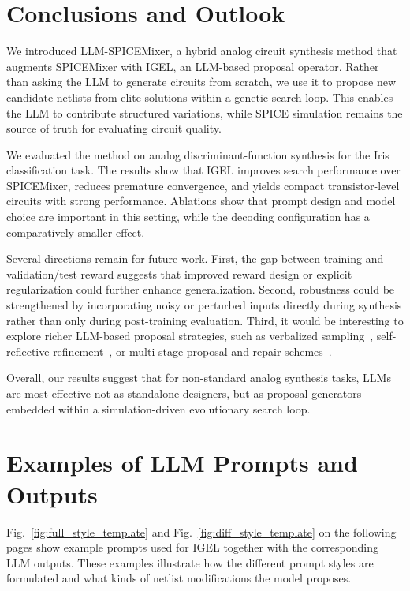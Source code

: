 \documentclass[sigconf,pbalance]{acmart_modified}
\newcommand{\squeezeSection}{}
\newcommand{\llmspm}{LLM-SPICE\-Mixer}
\newcommand{\spm}{SPICE\-Mixer}
\begin{document}
\squeezeSection\section{Conclusions and Outlook}
\label{sec:conclusions_and_outlook}

We introduced \llmspm{}, a hybrid analog circuit synthesis method that augments \spm{} with IGEL, an LLM-based proposal operator. Rather than asking the LLM to generate circuits from scratch, we use it to propose new candidate netlists from elite solutions within a genetic search loop. This enables the LLM to contribute structured variations, while SPICE simulation remains the source of truth for evaluating circuit quality.

We evaluated the method on analog discriminant-function synthesis for the Iris classification task. The results show that IGEL improves search performance over \spm{}, reduces premature convergence, and yields compact transistor-level circuits with strong performance. Ablations show that prompt design and model choice are important in this setting, while the decoding configuration has a comparatively smaller effect.

Several directions remain for future work. First, the gap between training and validation/test reward suggests that improved reward design or explicit regularization could further enhance generalization. Second, robustness could be strengthened by incorporating noisy or perturbed inputs directly during synthesis rather than only during post-training evaluation. Third, it would be interesting to explore richer LLM-based proposal strategies, such as verbalized sampling~\cite{zhang2025verbalized}, self-reflective refinement~\cite{madaan2023self,ye2024reevo}, or multi-stage proposal-and-repair schemes~\cite{zhang2025analogxpert,lai2026analogcoder}.

Overall, our results suggest that for non-standard analog synthesis tasks, LLMs are most effective not as standalone designers, but as proposal generators embedded within a simulation-driven evolutionary search loop.




\clearpage
\appendix
\onecolumn


\squeezeSection\section{Examples of LLM Prompts and Outputs}
\label{appx:prompt_and_output}
Fig.~\ref{fig:full_style_template} and Fig.~\ref{fig:diff_style_template} on the following pages show example prompts used for IGEL together with the corresponding LLM outputs. These examples illustrate how the different prompt styles are formulated and what kinds of netlist modifications the model proposes.
\end{document}
